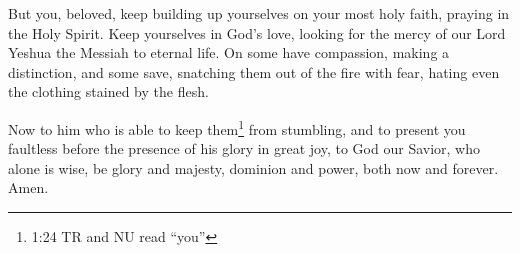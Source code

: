 \myverse{}But you, beloved, keep building up yourselves on your most holy faith, praying in the Holy Spirit. \myverse{}Keep yourselves in God’s love, looking for the mercy of our Lord Yeshua the Messiah to eternal life. \myverse{}On some have compassion, making a distinction, \myverse{}and some save, snatching them out of the fire with fear, hating even the clothing stained by the flesh.


\myverse{}Now to him who is able to keep them\footnote{1:24 TR and NU read “you”} from stumbling, and to present you faultless before the presence of his glory in great joy, \myverse{}to God our Savior, who alone is wise, be glory and majesty, dominion and power, both now and forever. Amen.



